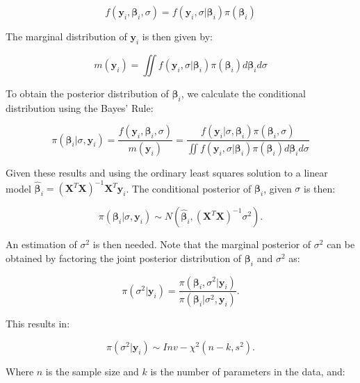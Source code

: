 \begin{equation}
f(\bm{y}_i,\bm{\beta}_i,\sigma) = f(\bm{y}_i,\sigma|\bm{\beta}_i) \pi (\bm{\beta}_i)
\end{equation}

The marginal distribution of $\bm{y}_i$ is then given by:

\begin{equation}
m(\bm{y}_i) = \iint f(\bm{y}_i,\sigma|\bm{\beta}_i) \pi (\bm{\beta}_i) d\bm{\beta}_i d\sigma
\end{equation}

To obtain the posterior distribution of $\bm{\beta}_i$, we calculate the conditional distribution using the Bayes' Rule:

\begin{equation}
\pi \left( \bm{\beta}_i| \sigma, \bm{y}_i \right) = \frac{f(\bm{y}_i,\bm{\beta}_i,\sigma)}{m(\bm{y}_i)} = \frac{ f(\bm{y}_i|\sigma, \bm{\beta}_i) \pi (\bm{\beta}_i,\sigma)}{\iint f(\bm{y}_i,\sigma|\bm{\beta}_i) \pi (\bm{\beta}_i) d\bm{\beta}_i d\sigma}
\end{equation}

Given these results and using the ordinary least squares solution to a linear model $\bm{\hat{\beta}}_i = \left( \bm{X}^T\bm{X} \right)^{-1}\bm{X}^T \bm{y}_i$. The conditional posterior of $\bm{\beta}_i$, given $\sigma$ is then:

\begin{equation}
\pi \left( \bm{\beta}_i|\sigma ,\bm{y}_i \right) \sim N\left( \bm{\hat{\beta}}_i, \left( \bm{X}^T\bm{X} \right)^{-1} \sigma^2 \right).
\end{equation}

An estimation of $\sigma^2$ is then needed. Note that the marginal posterior of $\sigma^2$ can be obtained by factoring the joint posterior distribution of $\bm{\beta}_i$ and $\sigma^2$ as:

\begin{equation}
\pi (\sigma^2|\bm{y}_i) = \frac{\pi \left( \bm{\beta}_i,\sigma^2 |\bm{y}_i \right)}{\pi \left( \bm{\beta}_i|\sigma^2 ,\bm{y}_i \right)}.
\end{equation}

This results in:

\begin{equation}
\pi (\sigma^2|\bm{y}_i) \sim Inv- \chi^2(n-k,s^2).
\end{equation}

Where $n$ is the sample size and $k$ is the number of parameters in the data, and:

